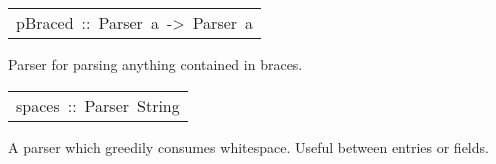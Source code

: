 \begin{haddockdesc}
\item[\begin{tabular}{@{}l}
pBraced\ ::\ Parser\ a\ ->\ Parser\ a
\end{tabular}]\haddockbegindoc
Parser for parsing anything contained in braces. 
\par

\end{haddockdesc}
\begin{haddockdesc}
\item[\begin{tabular}{@{}l}
spaces\ ::\ Parser\ String
\end{tabular}]\haddockbegindoc
A parser which greedily consumes whitespace. Useful between entries or fields. 
\par

\end{haddockdesc}